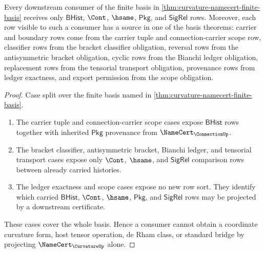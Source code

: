 \begin{theorem}
\label{thm:curvature-consumer-row-coverage}
Every downstream consumer of the finite basis in \autoref{thm:curvature-namecert-finite-basis} receives only $\mathsf{BHist}$, $\Cont$, $\hsame$, $\mathsf{Pkg}$, and $\mathsf{SigRel}$ rows. Moreover, each row visible to such a consumer has a source in one of the basis theorems: carrier and boundary rows come from the carrier tuple and connection-carrier scope row, classifier rows from the bracket classifier obligation, reversal rows from the antisymmetric bracket obligation, cyclic rows from the Bianchi ledger obligation, replacement rows from the tensorial transport obligation, provenance rows from ledger exactness, and export permission from the scope obligation.
\end{theorem}
\begin{proof}
Case split over the finite basis named in \autoref{thm:curvature-namecert-finite-basis}.

\begin{enumerate}
\item The carrier tuple and connection-carrier scope cases expose $\mathsf{BHist}$ rows together with inherited $\mathsf{Pkg}$ provenance from $\NameCert_{\ConnectionUp}$.

\item The bracket classifier, antisymmetric bracket, Bianchi ledger, and tensorial transport cases expose only $\Cont$, $\hsame$, and $\mathsf{SigRel}$ comparison rows between already carried histories.

\item The ledger exactness and scope cases expose no new row sort. They identify which carried $\mathsf{BHist}$, $\Cont$, $\hsame$, $\mathsf{Pkg}$, and $\mathsf{SigRel}$ rows may be projected by a downstream certificate.
\end{enumerate}

These cases cover the whole basis. Hence a consumer cannot obtain a coordinate curvature form, host tensor operation, de Rham class, or standard bridge by projecting $\NameCert_{\CurvatureUp}$ alone.
\end{proof}

